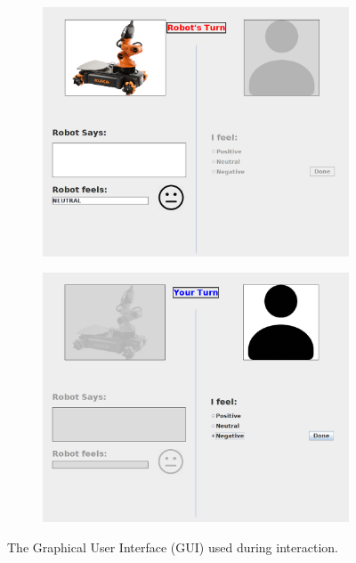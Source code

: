 \documentclass[12pt]{report}
\begin{document}
\begin{figure}
\centering
\begin{subfigure}{.5\textwidth}
  \centering
  \includegraphics[width=.95\linewidth]{figure/robot-turn-gui.png}
  \label{fig:gui-robot}
\end{subfigure}%
\begin{subfigure}{.5\textwidth}
  \centering
  \includegraphics[width=.95\linewidth]{figure/human-turn-gui.png}
  \label{fig:gui-human}
\end{subfigure}
\caption{The Graphical User Interface (GUI) used during interaction.}
\label{fig:gui}
\end{figure}
\end{document}

